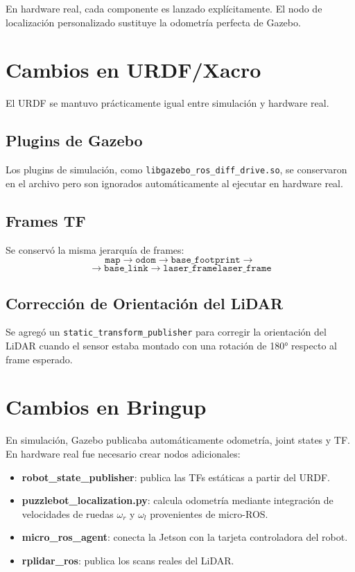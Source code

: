 \documentclass[conference]{IEEEtran}
\begin{document}
En hardware real, cada componente es lanzado explícitamente. El nodo de
localización personalizado sustituye la odometría perfecta de Gazebo.

\section{Cambios en URDF/Xacro}

El URDF se mantuvo prácticamente igual entre simulación y hardware real.

\subsection{Plugins de Gazebo}
Los plugins de simulación, como \texttt{libgazebo\_ros\_diff\_drive.so}, se
conservaron en el archivo pero son ignorados automáticamente al ejecutar en
hardware real.

\subsection{Frames TF}
Se conservó la misma jerarquía de frames:
\[
\texttt{map} \to \texttt{odom} \to \texttt{base\_footprint} \to
\]
\[
\to \texttt{base\_link} \to 
\texttt{laser\_frame}
\texttt{laser\_frame}
\]

\subsection{Corrección de Orientación del LiDAR}
Se agregó un \texttt{static\_transform\_publisher} para corregir la
orientación del LiDAR cuando el sensor estaba montado con una rotación de
180° respecto al frame esperado.

\section{Cambios en Bringup}

En simulación, Gazebo publicaba automáticamente odometría, joint states y TF.
En hardware real fue necesario crear nodos adicionales:

\begin{itemize}
  \item \textbf{robot\_state\_publisher}: publica las TFs estáticas a partir
  del URDF.
  \item \textbf{puzzlebot\_localization.py}: calcula odometría mediante
  integración de velocidades de ruedas $\omega_r$ y $\omega_l$ provenientes
  de micro-ROS.
  \item \textbf{micro\_ros\_agent}: conecta la Jetson con la tarjeta
  controladora del robot.
  \item \textbf{rplidar\_ros}: publica los scans reales del LiDAR.
\end{itemize}
\end{document}
